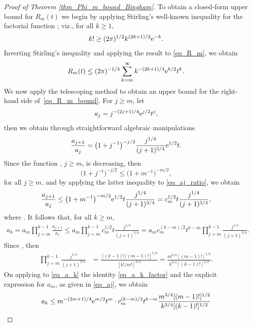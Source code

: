 \begin{proof}[Proof of Theorem \ref{thm_Phi_m_bound_Bingham}]
To obtain a closed-form upper bound for $R_m(t)$ we begin by applying Stirling's well-known inequality for the factorial function \cite[Theorem 1]{Impens}; viz., for all $k \ge 1$,
\[
k! \ge (2\pi)^{1/2} k^{(2k+1)/2} {\rm e}^{-k}.
\]
Inverting Stirling's inequality and applying the result to \eqref{eq_R_m}, we obtain
\begin{equation}
\label{eq_R_m_bound}
R_m(t) \le (2\pi)^{-1/4} \sum_{k=m}^\infty k^{-(2k+1)/4} {\rm e}^{k/2} t^k.
\end{equation}
We now apply the telescoping method to obtain an upper bound for the right-hand side of~\eqref{eq_R_m_bound}. For $j \ge m$, let
\begin{equation}
\label{eq_aj}
a_j = j^{-(2j+1)/4} {\rm e}^{j/2} t^j,
\end{equation}
then we obtain through straightforward algebraic manipulations
\begin{equation}
\label{eq_aj_ratio}
\frac{a_{j+1}}{a_j} = \bigl(1+j^{-1}\bigr)^{-j/2} \frac{j^{1/4}}{(j+1)^{3/4}} {\rm e}^{1/2} t.
\end{equation}
Since the function , $j \ge m$, is decreasing, then
\begin{equation}
\label{eq_c_m}
\bigl(1+j^{-1}\bigr)^{-j/2} \le \bigl(1+m^{-1}\bigr)^{-m/2},
\end{equation}
for all $j \ge m$, and by applying the latter inequality to \eqref{eq_aj_ratio}, we obtain
\[
\frac{a_{j+1}}{a_j} \le \bigl(1+m^{-1}\bigr)^{-m/2} {\rm e}^{1/2} t \frac{j^{1/4}}{(j+1)^{3/4}}
= c_m^{1/2} t \frac{j^{1/4}}{(j+1)^{3/4}},
\]
where . It follows that, for all $k \ge m$,
\begin{align}
\label{eq_a_k}
a_k = a_m \prod_{j=m}^{k-1} \frac{a_{j+1}}{a_j}
\le a_m \prod_{j=m}^{k-1} c_m^{1/2} t \frac{j^{1/4}}{(j+1)^{3/4}}= a_m c_m^{(k-m)/2} t^{k-m} \prod_{j=m}^{k-1} \frac{j^{1/4}}{(j+1)^{3/4}}.
\end{align}
Since , then
\begin{align}
\label{eq_a_k_factor}
\prod_{j=m}^{k-1} \frac{j^{1/4}}{(j+1)^{3/4}} &= \frac{[(k-1)!/(m-1)!]^{1/4}}{[k!/m!]^{3/4}}
= \frac{m^{3/4} [(m-1)!]^{1/2}}{k^{3/4} [(k-1)!]^{1/2}}.
\end{align}
On applying to \eqref{eq_a_k} the identity \eqref{eq_a_k_factor} and the explicit expression for $a_m$, as given in \eqref{eq_aj}, we obtain
\begin{align}
\label{eq_a_k_bound}
a_k &\le m^{-(2m+1)/4} {\rm e}^{m/2} t^m \cdot c_m^{(k-m)/2} t^{k-m} \frac{m^{3/4} [(m-1)!]^{1/2}}{k^{3/4} [(k-1)!]^{1/2}} \nonumber \\

\end{align}
\end{proof}
